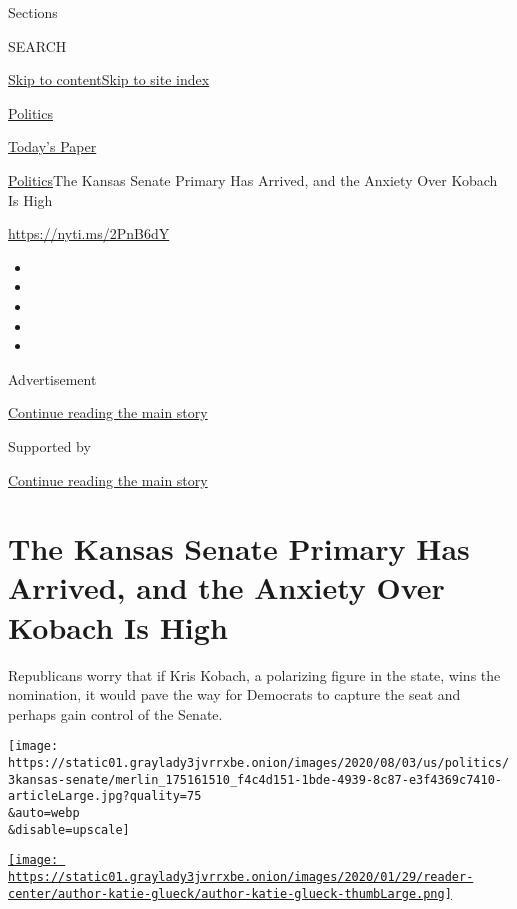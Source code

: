 Sections

SEARCH

\protect\hyperlink{site-content}{Skip to
content}\protect\hyperlink{site-index}{Skip to site index}

\href{https://www.nytimes3xbfgragh.onion/section/politics}{Politics}

\href{https://myaccount.nytimes3xbfgragh.onion/auth/login?response_type=cookie\&client_id=vi}{}

\href{https://www.nytimes3xbfgragh.onion/section/todayspaper}{Today's
Paper}

\href{/section/politics}{Politics}\textbar{}The Kansas Senate Primary
Has Arrived, and the Anxiety Over Kobach Is High

\href{https://nyti.ms/2PnB6dY}{https://nyti.ms/2PnB6dY}

\begin{itemize}
\item
\item
\item
\item
\item
\end{itemize}

Advertisement

\protect\hyperlink{after-top}{Continue reading the main story}

Supported by

\protect\hyperlink{after-sponsor}{Continue reading the main story}

\hypertarget{the-kansas-senate-primary-has-arrived-and-the-anxiety-over-kobach-is-high}{%
\section{The Kansas Senate Primary Has Arrived, and the Anxiety Over
Kobach Is
High}\label{the-kansas-senate-primary-has-arrived-and-the-anxiety-over-kobach-is-high}}

Republicans worry that if Kris Kobach, a polarizing figure in the state,
wins the nomination, it would pave the way for Democrats to capture the
seat and perhaps gain control of the Senate.

\texttt{[image: https://static01.graylady3jvrrxbe.onion/images/2020/08/03/us/politics/3kansas-senate/merlin\_175161510\_f4c4d151-1bde-4939-8c87-e3f4369c7410-articleLarge.jpg?quality=75\\\&auto=webp\\\&disable=upscale]}

\href{https://www.nytimes3xbfgragh.onion/by/katie-glueck}{\texttt{[image: https://static01.graylady3jvrrxbe.onion/images/2020/01/29/reader-center/author-katie-glueck/author-katie-glueck-thumbLarge.png]}}

